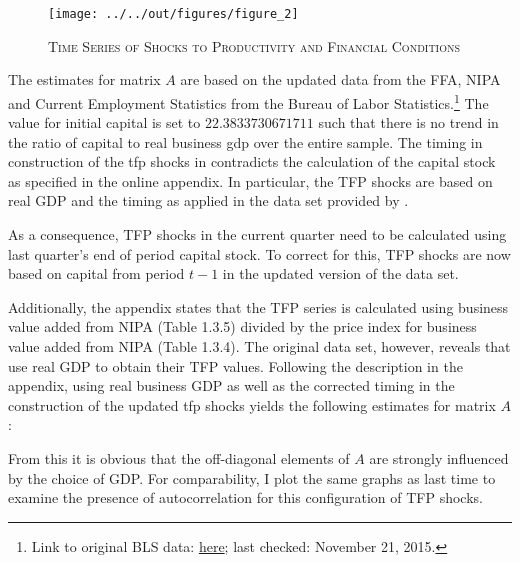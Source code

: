 \begin{figure}[ht]
    
    \centering

    \texttt{[image: ../../out/figures/figure\_2]}

    \caption{\textsc{Time Series of Shocks to Productivity and Financial Conditions}}
    
    \label{fig:figure_2}

\end{figure}

The estimates for matrix $A$ are based on the updated data from the FFA, NIPA and Current Employment Statistics from the Bureau of Labor Statistics.\footnote{Link to original BLS data: \href{https://research.stlouisfed.org/fred2/series/AWHI/downloaddata}{here}; last checked: November 21, 2015.} 
The value for initial capital is set to $22.3833730671711$ such that there is no trend in the ratio of capital to real business gdp over the entire sample.
The timing in construction of the tfp shocks in \citeauthor{JERMANNfinancial} contradicts the calculation of the capital stock as specified in the online appendix. In particular, the TFP shocks are based on real GDP and the timing as applied in the data set provided by \citeauthor{JERMANNfinancial}.


As a consequence, TFP shocks in the current quarter need to be calculated using last quarter's end of period capital stock. To correct for this, TFP shocks are now based on capital from period $t-1$ in the updated version of the data set. 

Additionally, the appendix states that the TFP series is calculated using business value added from NIPA (Table 1.3.5) divided by the price index for business value added from NIPA (Table 1.3.4). The original data set, however, reveals that \citeauthor{JERMANNfinancial} use real GDP to obtain their TFP values. Following the description in the appendix, using real business GDP as well as the corrected timing in the construction of the updated tfp shocks yields the following estimates for matrix $A$:

From this it is obvious that the off-diagonal elements of $A$ are strongly influenced by the choice of GDP. 
For comparability, I plot the same graphs as last time to examine the presence of  autocorrelation for this configuration of TFP shocks.\\[1.5ex]


